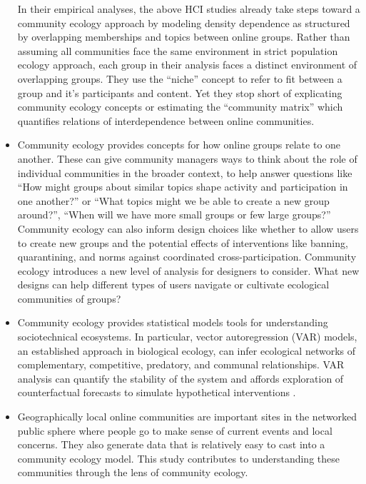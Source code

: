 \documentclass[12pt]{memoir}
\begin{document}
\begin{itemize}
In their empirical analyses, the above HCI studies already take steps toward a community ecology approach by modeling density dependence as structured by overlapping memberships and topics between online groups.  Rather than assuming all communities face the same environment in strict population ecology approach, each group in their analysis faces a distinct environment of overlapping groups. They use the ``niche'' concept to refer to fit between a group and it's participants and content. Yet they stop short of explicating community ecology concepts or estimating the ``community matrix'' which quantifies relations of interdependence between online communities. 

\item Community ecology provides concepts for how online groups relate to one another.  These can give community managers ways to think about the role of individual communities in the broader context, to help answer questions like ``How might groups about similar topics shape activity and participation in one another?'' or ``What topics might we be able to create a new group around?'', ``When will we have more small groups or few large groups?'' Community ecology can also inform design choices like whether to allow users to create new groups and the potential effects of interventions like banning, quarantining, and norms against coordinated cross-participation. Community ecology introduces a new level of analysis for designers to consider.  What new designs can help different types of users navigate or cultivate ecological communities of groups? 

\item Community ecology provides statistical models tools for understanding sociotechnical ecosystems.  In particular, vector autoregression (VAR) models, an established approach in biological ecology, can infer ecological networks of complementary, competitive, predatory, and communal relationships.  VAR analysis can quantify the stability of the system and affords exploration of counterfactual forecasts to simulate hypothetical interventions \citep{ives_estimating_2003}. 

\item Geographically local online communities are important sites in the networked public sphere where people go to make sense of current events and local concerns.  They also generate data that is relatively easy to cast into a community ecology model.  This study contributes to understanding these communities through the lens of community ecology.


\end{itemize}
\end{document}
